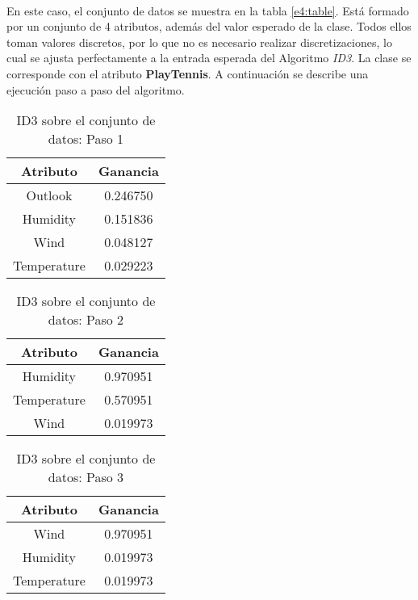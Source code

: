 \documentclass[10pt, a4paper,spanish]{article}
\begin{document}
		\paragraph{}
		En este caso, el conjunto de datos se muestra en la tabla \ref{e4:table}. Está formado por un conjunto de 4 atributos, además del valor esperado de la clase. Todos ellos toman valores discretos, por lo que no es necesario realizar discretizaciones, lo cual se ajusta perfectamente a la entrada esperada del Algoritmo \emph{ID3}. La clase se corresponde con el atributo \textbf{PlayTennis}. A continuación se describe una ejecución paso a paso del algoritmo.

		\begin{table}[H]
			\centering
			\begin{tabular}{| c | c |}
				\hline
	 			Atributo 			& Ganancia \\ \hline
				Outlook 			& 0.246750 \\ \hline
				Humidity 			& 0.151836 \\ \hline
				Wind 					& 0.048127 \\ \hline
				Temperature 	& 0.029223 \\ \hline
			\end{tabular}
			\caption{ID3 sobre el conjunto de datos: Paso 1}
			\label{e4:algorithm-step1}
		\end{table}

		\begin{table}[H]
			\centering
			\begin{tabular}{| c | c |}
				\hline
				Atributo 			& Ganancia \\ \hline
				Humidity 			& 0.970951 \\ \hline
				Temperature 	& 0.570951 \\ \hline
				Wind 					& 0.019973 \\ \hline
			\end{tabular}
			\caption{ID3 sobre el conjunto de datos: Paso 2}
			\label{e4:algorithm-step2}
		\end{table}

		\begin{table}[H]
			\centering
			\begin{tabular}{| c | c |}
				\hline
				Atributo 			& Ganancia \\ \hline
				Wind 					& 0.970951 \\ \hline
				Humidity 			& 0.019973 \\ \hline
				Temperature 	& 0.019973 \\ \hline
			\end{tabular}
			\caption{ID3 sobre el conjunto de datos: Paso 3}
			\label{e4:algorithm-step3}
		\end{table}
\end{document}
